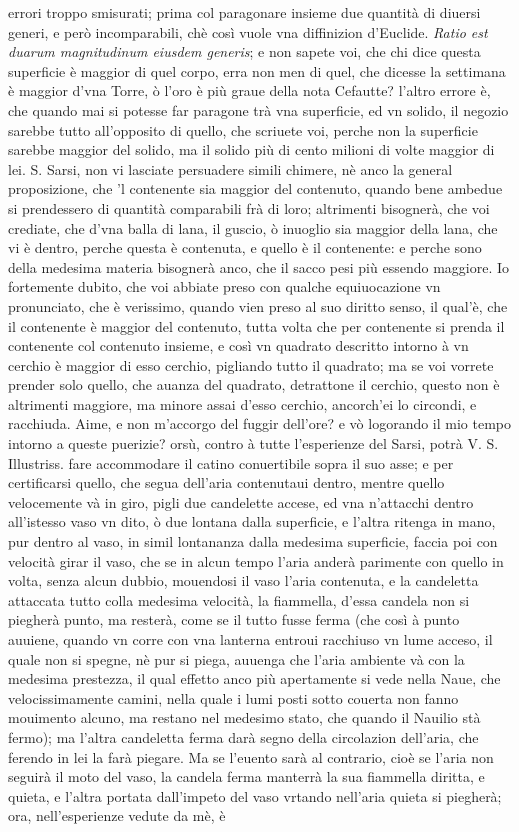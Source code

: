 \documentclass[11pt,twoside,openany]{book}
\begin{document}
errori troppo smisurati; prima col paragonare insieme due quantità di diuersi generi, e però incomparabili, chè così vuole vna diffinizion d'Euclide. \textit{Ratio est duarum magnitudinum eiusdem generis}; e non sapete voi, che chi dice questa superficie è maggior di quel corpo, erra non men di quel, che dicesse la settimana è maggior d'vna Torre, ò l'oro è più graue della nota Cefautte? l'altro errore è, che quando mai si potesse far paragone trà vna superficie, ed vn solido, il negozio sarebbe tutto all'opposito di quello, che scriuete voi, perche non la superficie sarebbe maggior del solido, ma il solido più di cento milioni di volte maggior di lei. S. Sarsi, non vi lasciate persuadere simili chimere, nè anco la general proposizione, che 'l contenente sia maggior del contenuto, quando bene ambedue si prendessero di quantità comparabili frà di loro; altrimenti bisognerà, che voi crediate, che d'vna balla di lana, il guscio, ò inuoglio sia maggior della lana, che vi è dentro, perche questa è contenuta, e quello è il contenente: e perche sono della medesima materia bisognerà anco, che il sacco pesi più essendo maggiore. Io fortemente dubito, che voi abbiate preso con qualche equiuocazione vn pronunciato, che è verissimo, quando vien preso al suo diritto senso, il qual'è, che il contenente è maggior del contenuto, tutta volta che per contenente si prenda il contenente col contenuto insieme, e così vn quadrato descritto intorno à vn cerchio è maggior di esso cerchio, pigliando tutto il quadrato; ma se voi vorrete prender solo quello, che auanza del quadrato, detrattone il cerchio, questo non è altrimenti maggiore, ma minore assai d'esso cerchio, ancorch'ei lo circondi, e racchiuda. Aime, e non m'accorgo del fuggir dell'ore? e vò logorando il mio tempo intorno a queste puerizie? orsù, contro à tutte l'esperienze del Sarsi, potrà V. S. Illustriss. fare accommodare il catino conuertibile sopra il suo asse; e per certificarsi quello, che segua dell'aria contenutaui dentro, mentre quello velocemente và in giro, pigli due candelette accese, ed vna n'attacchi dentro all'istesso vaso vn dito, ò due lontana dalla superficie, e l'altra ritenga in mano, pur dentro al vaso, in simil lontananza dalla medesima superficie, faccia poi con velocità girar il vaso, che se in alcun tempo l'aria anderà parimente con quello in volta, senza alcun dubbio, mouendosi il vaso l'aria contenuta, e la candeletta attaccata tutto colla medesima velocità, la fiammella, d'essa candela non si piegherà punto, ma resterà, come se il tutto fusse ferma (che così à punto auuiene, quando vn corre con vna lanterna entroui racchiuso vn lume acceso, il quale non si spegne, nè pur si piega, auuenga che l'aria ambiente và con la medesima prestezza, il qual effetto anco più apertamente si vede nella Naue, che velocissimamente camini, nella quale i lumi posti sotto couerta non fanno mouimento alcuno, ma restano nel medesimo stato, che quando il Nauilio stà fermo); ma l'altra candeletta ferma darà segno della circolazion dell'aria, che ferendo in lei la farà piegare. Ma se l'euento sarà al contrario, cioè se l'aria non seguirà il moto del vaso, la candela ferma manterrà la sua fiammella diritta, e quieta, e l'altra portata dall'impeto del vaso vrtando nell'aria quieta si piegherà; ora, nell'esperienze vedute da mè, è 
\end{document}
